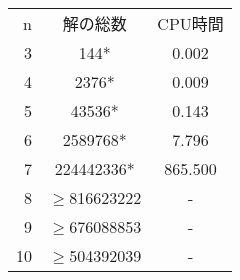 \begin{table}[tb]
\begin{tabular}{r|c|c}
 \hline
 n& 解の総数& CPU時間\\
 3&144*&0.002\\
 4&2376*&0.009\\
 5&43536*&0.143\\
 6&2589768*&7.796\\
 7&224442336*&865.500\\
 8&$\geq$816623222&-\\
 9&$\geq$676088853&-\\
 10&$\geq$504392039&-\\
\end{tabular}
\end{table}